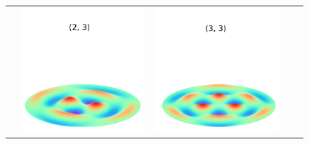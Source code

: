 \documentclass[a4paper]{ctexart}
\begin{document}
\begin{figure}[htbp]
\begin{tabular}{ccccc}
			& \includegraphics[scale=0.4]{2_3.png} & \includegraphics[scale=0.4]{3_3.png}

\end{tabular}
\end{figure}
\end{document}
